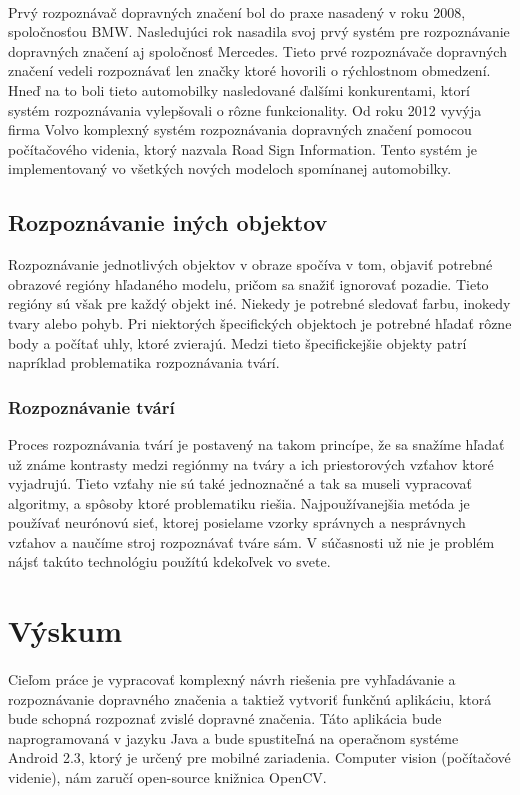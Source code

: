 \documentclass[12pt]{article}
\begin{document}
\paragraph{}
Prvý rozpoznávač dopravných značení bol do praxe nasadený v roku 2008, spoločnosťou BMW.\cite{bmw} Nasledujúci rok nasadila svoj prvý systém pre rozpoznávanie dopravných značení aj spoločnosť Mercedes.\cite{mercedes}
Tieto prvé rozpoznávače dopravných značení vedeli rozpoznávať len značky ktoré hovorili o rýchlostnom obmedzení. Hneď na to boli tieto automobilky nasledované ďalšími konkurentami, ktorí systém rozpoznávania vylepšovali o rôzne funkcionality.
Od roku 2012 vyvýja firma Volvo komplexný systém rozpoznávania dopravných značení pomocou počítačového videnia, ktorý nazvala Road Sign Information. Tento systém je implementovaný vo všetkých nových modeloch spomínanej automobilky.\cite{volvo}
\subsection{Rozpoznávanie iných objektov}
Rozpoznávanie jednotlivých objektov v obraze spočíva v tom, objaviť potrebné obrazové regióny hľadaného modelu, pričom sa snažiť ignorovať pozadie.
Tieto regióny sú však pre každý objekt iné. Niekedy je potrebné sledovať farbu, inokedy tvary alebo pohyb. Pri niektorých špecifických objektoch je potrebné hľadať rôzne body a počítať uhly, ktoré zvierajú.
Medzi tieto špecifickejšie objekty patrí napríklad problematika rozpoznávania tvárí.
\cite{object_rec_scene}
\subsubsection{Rozpoznávanie tvárí}
Proces rozpoznávania tvárí je postavený na takom princípe, že sa snažíme hľadať už známe kontrasty medzi regiónmy na tváry a ich priestorových vzťahov ktoré vyjadrujú.
Tieto vzťahy nie sú také jednoznačné a tak sa museli vypracovať algoritmy, a spôsoby ktoré problematiku riešia. 
Najpoužívanejšia metóda je používať neurónovú sieť, ktorej posielame vzorky správnych a nesprávnych vzťahov a naučíme stroj rozpoznávať tváre sám.
V súčasnosti už nie je problém nájsť takúto technológiu použítú kdekoľvek vo svete.
\cite{object_detection_viola}
\section{Výskum}
\paragraph{}
Cieľom práce je vypracovať komplexný návrh riešenia pre vyhľadávanie a rozpoznávanie dopravného značenia a taktiež vytvoriť funkčnú aplikáciu, ktorá
bude schopná rozpoznať zvislé dopravné značenia. Táto aplikácia bude naprogramovaná v jazyku Java a bude spustiteľná na
 operačnom systéme Android 2.3, ktorý je určený pre mobilné zariadenia. Computer vision (počítačové videnie), nám zaručí open-source knižnica OpenCV.
\end{document}
